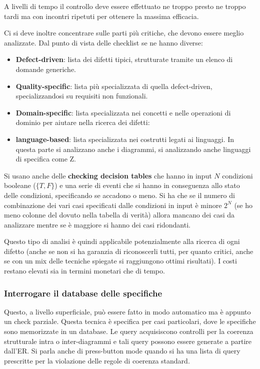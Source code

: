 A livelli di tempo il controllo deve essere effettuato ne troppo presto ne troppo
tardi ma con incontri ripetuti per ottenere la massima efficacia.

Ci si deve inoltre concentrare sulle parti più critiche, che devono essere meglio
analizzate. Dal punto di vista delle checklist se ne hanno diverse:
\begin{itemize}
    \item \textbf{Defect-driven}: lista dei difetti tipici, strutturate tramite
          un elenco di domande generiche.
    \item \textbf{Quality-specific}: lista più specializzata di quella defect-driven,
          specializzandosi su requisiti non funzionali.
    \item \textbf{Domain-specific}: lista specializzata nei concetti e nelle
          operazioni di dominio per aiutare nella ricerca dei difetti:
    \item \textbf{language-based}: lista specializzata nei costrutti legati ai linguaggi.
          In questa parte si analizzano anche i diagrammi, si analizzando anche
          linguaggi di specifica come Z.
\end{itemize}
Si usano anche delle \textbf{checking decision tables} che hanno in input $N$
condizioni booleane ($\{T, F\}$) e una serie di eventi che si hanno in conseguenza
allo stato delle condizioni, specificando se accadono o meno. Si ha che se il
numero di combinazione dei vari casi specificati dalle condizioni in input è minore
$2^N$ (se ho meno colonne del dovuto nella tabella di verità) allora mancano dei
casi da analizzare mentre se è maggiore si hanno dei casi ridondanti.

Questo tipo di analisi è quindi applicabile potenzialmente alla ricerca di ogni
difetto (anche se non si ha garanzia di riconoscerli tutti, per quanto critici,
anche se con un mix delle tecniche spiegate si raggiungono ottimi risultati).
I costi restano elevati sia in termini monetari che di tempo.
\subsubsection{Interrogare il database delle specifiche}
Questo, a livello superficiale, può essere fatto in modo automatico ma è appunto
un check parziale. Questa tecnica è specifica per casi particolari, dove le
specifiche sono memorizzate in un database. Le query acquisiscono controlli per
la coerenza strutturale intra o inter-diagrammi e tali query possono essere generate
a partire dall'ER. Si parla anche di press-button mode quando si ha una lista
di query prescritte per la violazione delle regole di coerenza standard.
